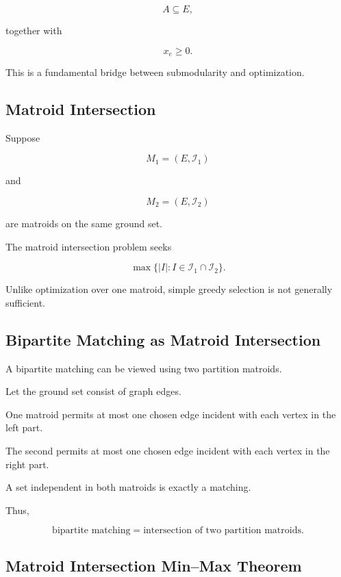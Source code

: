 \[
A\subseteq E,
\]

together with

\[
x_e\geq0.
\]

This is a fundamental bridge between submodularity and optimization.

\subsection{Matroid Intersection}
\label{subsec:matroid-intersection}

Suppose

\[
M_1=(E,\mathcal{I}_1)
\]

and

\[
M_2=(E,\mathcal{I}_2)
\]

are matroids on the same ground set.

The matroid intersection problem seeks

\[
\boxed{
\max
\{
|I|:
I\in\mathcal{I}_1\cap\mathcal{I}_2
\}.
}
\]

Unlike optimization over one matroid, simple greedy selection is not
generally sufficient.

\subsection{Bipartite Matching as Matroid Intersection}
\label{subsec:matching-matroid-intersection}

A bipartite matching can be viewed using two partition matroids.

Let the ground set consist of graph edges.

One matroid permits at most one chosen edge incident with each vertex
in the left part.

The second permits at most one chosen edge incident with each vertex in
the right part.

A set independent in both matroids is exactly a matching.

Thus,

\[
\boxed{
\text{bipartite matching}
=
\text{intersection of two partition matroids}.
}
\]

\subsection{Matroid Intersection Min--Max Theorem}
\label{subsec:matroid-intersection-theorem}


